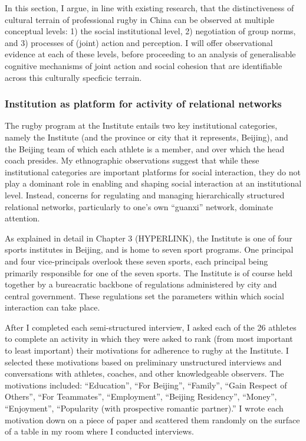 In this section, I argue, in line with existing research, that the distinctiveness of cultural terrain of professional rugby in China can be observed at multiple conceptual levels: 1) the social institutional level, 2) negotiation of group norms, and 3) processes of (joint) action and perception.  I will offer observational evidence at each of these levels, before proceeding to an analysis of generalisable cognitive mechanisms of joint action and social cohesion that are identifiable across this culturally specficic terrain.

\subsubsection{Institution as platform for activity of relational networks}

The rugby program at the Institute entails two key institutional categories, namely the Institute (and the province or city that it represents, Beijing), and the Beijing team of which each athlete is a member, and over which the head coach presides.  My ethnographic observations suggest that while these institutional categories are important platforms for social interaction, they do not play a dominant role in enabling and shaping social interaction at an institutional level.  Instead, concerns for regulating and managing hierarchically structured relational networks, particularly to one's own ``guanxi'' network, dominate attention.

As explained in detail in Chapter 3 (HYPERLINK), the Institute is one
of four sports institutes in Beijing, and is home to seven sport programs.  One principal and four vice-principals overlook these seven sports, each principal being primarily responsible for one of the seven sports.  The Institute is of course held together by a bureacratic backbone of regulations administered by city and central government.  These regulations set the parameters within which social interaction can take place.



After I completed each semi-structured interview, I asked each of the 26 athletes to complete an activity in which they were asked to rank (from most important to least important) their motivations for adherence to rugby at the Institute.  I selected these motivations based on preliminary unstructured interviews and conversations with athletes, coaches, and other knowledgeable observers.  The motivations included: ``Education'', ``For Beijing'', ``Family'', ``Gain Respect of Others'', ``For Teammates'', ``Employment'', ``Beijing Residency'', ``Money'', ``Enjoyment'', ``Popularity (with prospective romantic partner).'' I wrote each motivation down on a piece of paper and scattered them randomly on the surface of a table in my room where I conducted interviews.

